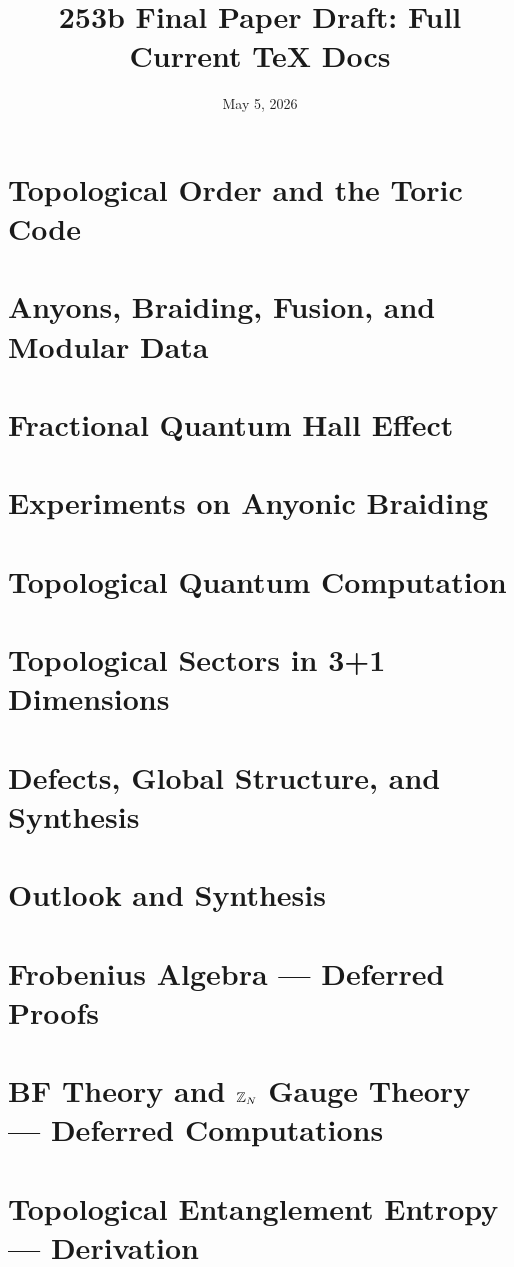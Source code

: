 \documentclass[11pt]{report}
\title{253b Final Paper Draft: Full Current TeX Docs}
\author{}
\date{May 5, 2026}
\begin{document}
\maketitle
\tableofcontents










\chapter{Topological Order and the Toric Code}\label{ch:topological-order}

\chapter{Anyons, Braiding, Fusion, and Modular Data}\label{ch:anyons}

\chapter{Fractional Quantum Hall Effect}\label{ch:fqhe}

\chapter{Experiments on Anyonic Braiding}\label{ch:experiments}

\chapter{Topological Quantum Computation}\label{ch:tqc}

\chapter{Topological Sectors in 3+1 Dimensions}\label{ch:sectors-3plus1d}

\chapter{Defects, Global Structure, and Synthesis}\label{ch:defects-synthesis}

\chapter{Outlook and Synthesis}\label{ch:outlook}


\appendix

\chapter{Frobenius Algebra --- Deferred Proofs}


\chapter{BF Theory and $\mathbb{Z}_N$ Gauge Theory --- Deferred Computations}


\setcounter{chapter}{4}
\chapter{Topological Entanglement Entropy --- Derivation}




\end{document}
